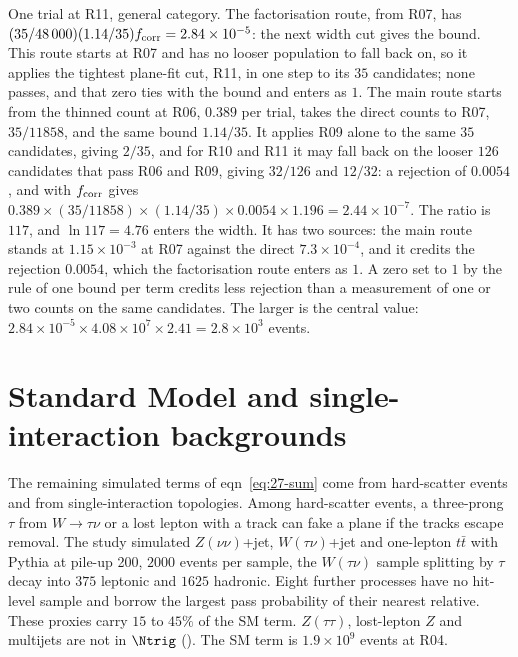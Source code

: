 \begin{example}\label{exa:27-routes}
One trial at R11, general category. The factorisation route, from R07, has $(35/48\,000)(1.14/35)f_{\rm corr}=2.84\times10^{-5}$: the next width cut gives the bound. This route starts at R07 and has no looser population to fall back on, so it applies the tightest plane-fit cut, R11, in one step to its $35$ candidates; none passes, and that zero ties with the bound and enters as $1$. The main route starts from the thinned count at R06, $0.389$ per trial, takes the direct counts to R07, $35/11858$, and the same bound $1.14/35$. It applies R09 alone to the same $35$ candidates, giving $2/35$, and for R10 and R11 it may fall back on the looser $126$ candidates that pass R06 and R09, giving $32/126$ and $12/32$: a rejection of $0.0054$, and with $f_{\rm corr}$ gives $0.389\times(35/11858)\times(1.14/35)\times0.0054\times1.196=2.44\times10^{-7}$. The ratio is $117$, and $\ln117=4.76$ enters the width. It has two sources: the main route stands at $1.15\times10^{-3}$ at R07 against the direct $7.3\times10^{-4}$, and it credits the rejection $0.0054$, which the factorisation route enters as $1$. A zero set to $1$ by the rule of one bound per term credits less rejection than a measurement of one or two counts on the same candidates. The larger is the central value: $2.84\times10^{-5}\times4.08\times10^7\times2.41=2.8\times10^3$ events.
\end{example}

\section{Standard Model and single-interaction backgrounds}\label{sec:27-others}

The remaining simulated terms of eqn~\eqref{eq:27-sum} come from hard-scatter events and from single-interaction topologies. Among hard-scatter events, a three-prong $\tau$ from $W\to\tau\nu$ or a lost lepton with a track can fake a plane if the tracks escape removal. The study simulated $Z(\nu\nu)$+jet, $W(\tau\nu)$+jet and one-lepton $t\bar t$ with
Pythia at pile-up 200, $2000$ events per sample, the $W(\tau\nu)$ sample splitting by $\tau$ decay into $375$ leptonic and $1625$ hadronic. Eight further processes have no hit-level sample and borrow the largest pass probability of their nearest relative. These proxies carry $15$ to $45\%$ of the SM term. $Z(\tau\tau)$, lost-lepton $Z$ and multijets are not in $\Ntrig$ (\UNV). The SM term is $1.9\times10^9$ events at R04.

